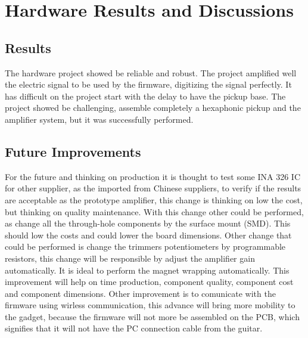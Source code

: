 \section{Hardware Results and Discussions}

\subsection{Results}
The hardware project showed be reliable and robust. The project amplified
well the electric signal to be used by the firmware, digitizing the signal
perfectly. It has difficult on the project start with the delay to have
the pickup base. The project showed be challenging, assemble completely a
hexaphonic pickup and the amplifier system, but it was successfully performed.

\subsection{Future Improvements}
For the future and thinking on production it is thought to test some INA 326 IC
for other supplier, as the imported from Chinese suppliers, to verify if the results
are acceptable as the prototype amplifier, this change is thinking on low the cost,
but thinking on quality maintenance.
With this change other could be performed, as change all the through-hole components
by the surface mount (SMD). This should low the costs and could lower the board dimensions.
Other change that could be performed is change the trimmers potentiometers by programmable
resistors, this change will be responsible by adjust the amplifier gain automatically.
It is ideal to perform the magnet wrapping automatically. This improvement will help on time
production, component quality, component cost and component dimensions.
Other improvement is to comunicate with the firmware using wirless communication,
this advance will bring more mobility to the gadget, because the firmware will not more be
assembled on the PCB, which signifies that it will not have the PC connection cable from the guitar.
